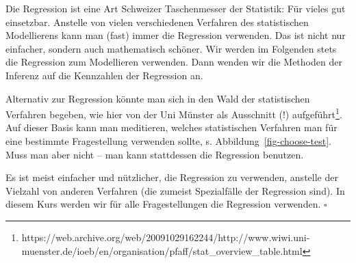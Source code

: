 \documentclass[
  ngerman,
  letterpaper,
  twoside,
  open=any]{scrbook}
\theoremstyle{definition}
\theoremstyle{plain}
\theoremstyle{definition}
\theoremstyle{definition}
\theoremstyle{definition}
\theoremstyle{definition}
\theoremstyle{remark}
\begin{document}
Die Regression ist eine Art Schweizer Taschenmesser der Statistik: Für
vieles gut einsetzbar. Anstelle von vielen verschiedenen Verfahren des
statistischen Modellierens kann man (fast) immer die Regression
verwenden. Das ist nicht nur einfacher, sondern auch mathematisch
schöner. Wir werden im Folgenden stets die Regression zum Modellieren
verwenden. Dann wenden wir die Methoden der Inferenz auf die Kennzahlen
der Regression an.

Alternativ zur Regression könnte man sich in den Wald der statistischen
Verfahren begeben, wie hier von der Uni Münster als Ausschnitt (!)
aufgeführt\footnote{https://web.archive.org/web/20091029162244/http://www.wiwi.uni-muenster.de/ioeb/en/organisation/pfaff/stat\_overview\_table.html}.
Auf dieser Basis kann man meditieren, welches statistischen Verfahren
man für eine bestimmte Fragestellung verwenden sollte, s.
Abbildung~\ref{fig-choose-test}. Muss man aber nicht -- man kann
stattdessen die Regression benutzen.

\begin{tcolorbox}[enhanced jigsaw, arc=.35mm, bottomrule=.15mm, bottomtitle=1mm, breakable, colback=white, colbacktitle=quarto-callout-note-color!10!white, colframe=quarto-callout-note-color-frame, coltitle=black, left=2mm, leftrule=.75mm, opacityback=0, opacitybacktitle=0.6, rightrule=.15mm, title=\textcolor{quarto-callout-note-color}{\faInfo}\hspace{0.5em}{Hinweis}, titlerule=0mm, toprule=.15mm, toptitle=1mm]

Es ist meist einfacher und nützlicher, die Regression zu verwenden,
anstelle der Vielzahl von anderen Verfahren (die zumeist Spezialfälle
der Regression sind). In diesem Kurs werden wir für alle Fragestellungen
die Regression verwenden.\footnotemark{} \(\square\)

\end{tcolorbox}

\end{document}
